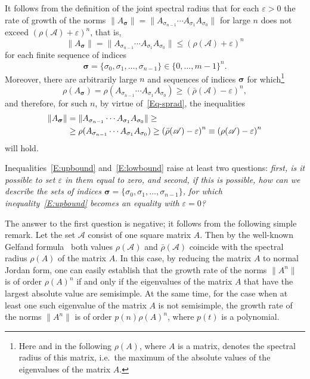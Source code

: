 \documentclass[a4paper,10pt,reqno]{amsart}
\let\cite\citep
\newcommand{\setA}{\mathscr{A}}
\begin{document}
It follows from the definition of the joint spectral radius that for each
$\varepsilon>0$ the rate of growth of the norms
$\|A_{\boldsymbol{\sigma}}\|=\|A_{\sigma_{n-1}}\cdots
A_{\sigma_{1}}A_{\sigma_{0}}\|$ for large $n$ does not exceed
${(\rho({\setA})+\varepsilon)}^{n}$, that is,
\begin{equation}\label{E:upbound}
\|A_{\boldsymbol{\sigma}}\|=\|A_{\sigma_{n-1}}\cdots
A_{\sigma_{1}}A_{\sigma_{0}}\|\le {(\rho({\setA})+\varepsilon)}^{n}
\end{equation}
for each finite sequence of indices
\[
\boldsymbol{\sigma}=
\{\sigma_{0},\sigma_{1},\ldots,\sigma_{n-1}\}\in{\{0,\ldots,m-1\}}^{n}.
\]
Moreover, there are arbitrarily large $n$ and sequences of indices
$\boldsymbol{\sigma}$ for which\footnote{Here and in the following $\rho(A)$,
where $A$ is a matrix, denotes the spectral radius of this matrix, i.e.\ the
maximum of the absolute values of the eigenvalues of the matrix $A$.}
\[
\rho(A_{\boldsymbol{\sigma}})=\rho(A_{\sigma_{n-1}}\cdots
A_{\sigma_{1}}A_{\sigma_{0}}) \ge {(\bar{\rho}({\setA})-\varepsilon)}^{n},
\]
and therefore, for such $n$, by virtue of~\eqref{Eq-sprad}, the inequalities
\begin{align}\notag
\|A_{\boldsymbol{\sigma}}\|&=\|A_{\sigma_{n-1}}\cdots
A_{\sigma_{1}}A_{\sigma_{0}}\|\ge\\
\label{E:lowbound} &\ge \rho(A_{\sigma_{n-1}}\cdots
A_{\sigma_{1}}A_{\sigma_{0}}) \ge
{(\bar{\rho}({\setA})-\varepsilon)}^{n}\equiv
{(\rho({\setA})-\varepsilon)}^{n}
\end{align}
will hold.

Inequalities~\eqref{E:upbound} and~\eqref{E:lowbound} raise at least two
questions: \emph{first, is it possible to set $\varepsilon$ in them equal to
zero, and second, if this is possible, how can we describe the sets of
indices $\boldsymbol{\sigma}= \{\sigma_{0},\sigma_{1},\ldots,\sigma_{n-1}\}$,
for which inequality~\eqref{E:upbound} becomes an equality with
$\varepsilon=0$?}

The answer to the first question is negative; it follows from the following
simple remark. Let the set $\setA$ consist of one square matrix $A$. Then by
the well-known Gelfand formula~\cite[Corollary~5.6.14]{HJ:e} both values
$\rho({\setA})$ and $\bar{\rho}({\setA})$ coincide with the spectral radius
$\rho(A)$ of the matrix $A$. In this case, by reducing the matrix $A$ to
normal Jordan form, one can easily establish that the growth rate of the
norms $\|A^{n}\|$ is of order ${\rho(A)}^{n}$ if and only if the eigenvalues
of the matrix $A$ that have the largest absolute value are semisimple. At the
same time, for the case when at least one such eigenvalue of the matrix $A$
is not semisimple, the growth rate of the norms $\|A^{n}\|$ is of order
$p(n){\rho(A)}^{n}$, where $p(t)$ is a polynomial.
\end{document}
